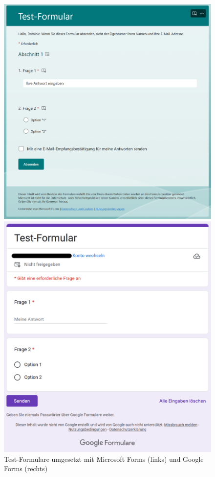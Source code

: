\documentclass[a4paper,12pt,twoside,numbers=noendperiod]{scrreprt}
\begin{document}
\begin{figure}[ht]
    \centering
    \begin{minipage}{.49\textwidth}
        \centering
        \includegraphics[width=.95\linewidth]{thesis/images/Luidold_Microsoft-Forms-Testformular.png}
    \end{minipage}
    \begin{minipage}{.49\textwidth}
        \centering
        \includegraphics[width=.95\linewidth]{thesis/images/Luidold_Google-Forms-Testformular.png}
    \end{minipage}
    \caption[Test-Formulare umgesetzt mit Microsoft Forms und Google Forms]{Test-Formulare umgesetzt mit Microsoft Forms (links) und Google Forms (rechts)}
    \label{fig:microsoft-google-forms-testformulare}
\end{figure}
\end{document}
